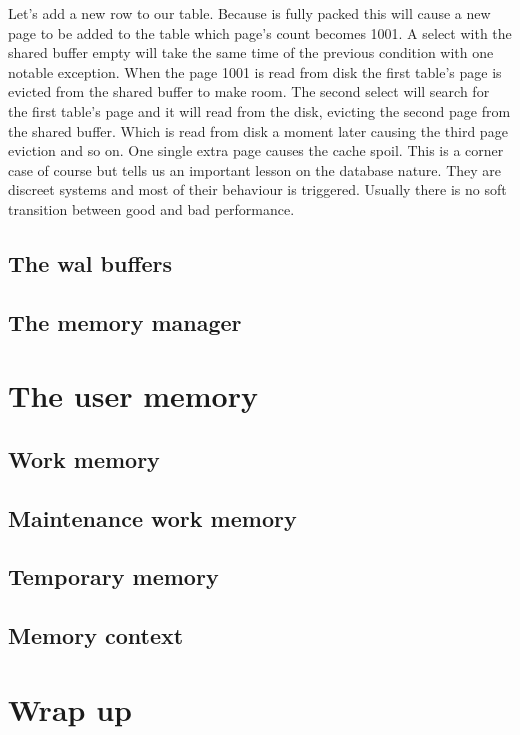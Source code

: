 Let's add a new row to our table. Because is fully packed this will cause a new page to be added to the 
table which page's count becomes 1001. A select with the shared buffer empty will take the same time of the 
previous condition with one notable exception. When the page 1001 is read from disk the first table's page 
is evicted from the shared buffer to make room. The second select will search for the first table's page 
and it will read from the disk, evicting the second page from the shared buffer. Which is read from disk a 
moment later causing the third page eviction and so on. One single extra page causes the cache spoil. This 
is a corner case of course but tells us an important lesson on the database nature. They are discreet 
systems and most of their behaviour is triggered. Usually there is no soft transition between good and bad
performance. 

\subsection{The wal buffers}

\subsection{The memory manager}
\section{The user memory}
\subsection{Work memory}
\subsection{Maintenance work memory}
\subsection{Temporary memory}


\subsection{Memory context}

\section{Wrap up}